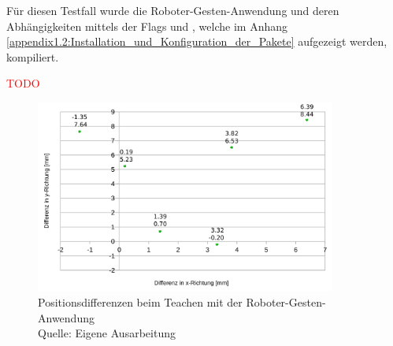 Für diesen Testfall wurde die Roboter-Gesten-Anwendung und deren Abhängigkeiten mittels der Flags  und , welche im Anhang \ref{appendix1.2:Installation_und_Konfiguration_der_Pakete} aufgezeigt werden, kompiliert.

\textcolor{red}{TODO}




\begin{figure}[htb]
	\centering
	\includegraphics[width=0.88\textwidth]{images/ergebnisse/Differenzen_beim_Teachen_mit_Gesten}
	\caption[Positionsdifferenzen beim Teachen mit der Roboter-Gesten-Anwendung]{Positionsdifferenzen beim Teachen mit der Roboter-Gesten-Anwendung\\Quelle: Eigene Ausarbeitung}
	\label{fig:measurement_teaching_positions}
\end{figure}
\FloatBarrier

